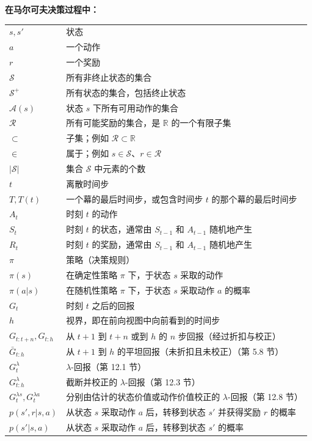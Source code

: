 \documentclass[UTF8,12pt,a4paper,fontset=fandol]{ctexart}
\begin{document}
\noindent\textbf{在马尔可夫决策过程中：}
\begin{longtable}{p{}p{}}
$s,s'$ & 状态 \\
$a$ & 一个动作 \\
$r$ & 一个奖励 \\
$\mathcal{S}$ & 所有非终止状态的集合 \\
$\mathcal{S}^+$ & 所有状态的集合，包括终止状态 \\
$\mathcal{A}(s)$ & 状态 $s$ 下所有可用动作的集合 \\
$\mathcal{R}$ & 所有可能奖励的集合，是 $\mathbb{R}$ 的一个有限子集 \\
$\subset$ & 子集；例如 $\mathcal{R}\subset\mathbb{R}$ \\
$\in$ & 属于；例如 $s\in\mathcal{S}$、$r\in\mathcal{R}$ \\
$|\mathcal{S}|$ & 集合 $\mathcal{S}$ 中元素的个数 \\
$t$ & 离散时间步 \\
$T,T(t)$ & 一个幕的最后时间步，或包含时间步 $t$ 的那个幕的最后时间步 \\
$A_t$ & 时刻 $t$ 的动作 \\
$S_t$ & 时刻 $t$ 的状态，通常由 $S_{t-1}$ 和 $A_{t-1}$ 随机地产生 \\
$R_t$ & 时刻 $t$ 的奖励，通常由 $S_{t-1}$ 和 $A_{t-1}$ 随机地产生 \\
$\pi$ & 策略（决策规则） \\
$\pi(s)$ & 在确定性策略 $\pi$ 下，于状态 $s$ 采取的动作 \\
$\pi(a|s)$ & 在随机性策略 $\pi$ 下，于状态 $s$ 采取动作 $a$ 的概率 \\
$G_t$ & 时刻 $t$ 之后的回报 \\
$h$ & 视界，即在前向视图中向前看到的时间步 \\
$G_{t:t+n},G_{t:h}$ & 从 $t+1$ 到 $t+n$ 或到 $h$ 的 $n$ 步回报（经过折扣与校正） \\
$\bar G_{t:h}$ & 从 $t+1$ 到 $h$ 的平坦回报（未折扣且未校正）（第 5.8 节） \\
$G_t^\lambda$ & $\lambda$-回报（第 12.1 节） \\
$G_{t:h}^\lambda$ & 截断并校正的 $\lambda$-回报（第 12.3 节） \\
$G_t^{\lambda s},G_t^{\lambda a}$ & 分别由估计的状态价值或动作价值校正的 $\lambda$-回报（第 12.8 节） \\
$p(s',r|s,a)$ & 从状态 $s$ 采取动作 $a$ 后，转移到状态 $s'$ 并获得奖励 $r$ 的概率 \\
$p(s'|s,a)$ & 从状态 $s$ 采取动作 $a$ 后，转移到状态 $s'$ 的概率 \\

\end{longtable}
\end{document}
